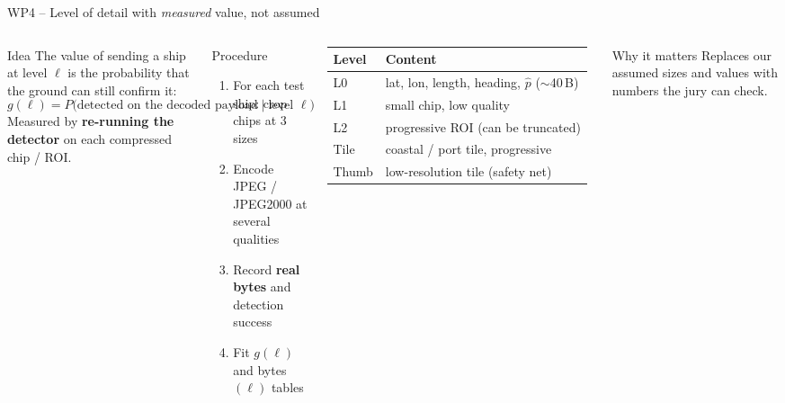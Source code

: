 \documentclass[aspectratio=169,10pt]{beamer}
\begin{document}
\begin{frame}{WP4 -- Level of detail with \emph{measured} value, not assumed}
\begin{columns}[T]
\begin{block}{Idea}
\footnotesize The value of sending a ship at level $\ell$ is the probability that the ground can still confirm it:
\[ g(\ell) = P\big(\text{detected on the decoded payload} \mid \text{level } \ell\big) \]
Measured by \textbf{re-running the detector} on each compressed chip / ROI.
\end{block}
\begin{block}{Procedure}
\footnotesize
\begin{enumerate}
  \item For each test ship: crop chips at 3 sizes
  \item Encode JPEG / JPEG2000 at several qualities
  \item Record \textbf{real bytes} and detection success
  \item Fit $g(\ell)$ and bytes$(\ell)$ tables
\end{enumerate}
\end{block}
\footnotesize
\renewcommand{\arraystretch}{1.25}
\begin{tabularx}{\linewidth}{@{}l L@{}}
\toprule
\textbf{Level} & \textbf{Content} \\
\midrule
L0 & lat, lon, length, heading, $\hat p$ ($\sim$40\,B) \\
L1 & small chip, low quality \\
L2 & progressive ROI (can be truncated) \\
Tile & coastal / port tile, progressive \\
Thumb & low-resolution tile (safety net) \\
\bottomrule
\end{tabularx}
\vspace{2mm}
\begin{exampleblock}{Why it matters}
\footnotesize Replaces our assumed sizes and values with numbers the jury can check.
\end{exampleblock}
\end{columns}
\end{frame}
\end{document}
